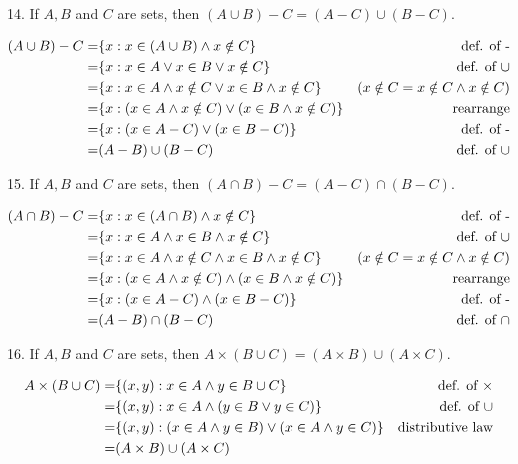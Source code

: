 \documentclass{idrisMemo}
\begin{document}
\begin{prooflist}{14. If $A, B$ and $C$ are sets, then $(A \cup B)-C=(A-C) \cup(B-C)$.}
\item
\begin{align*}
    (A\cup B) - C =& \{x: x\in (A\cup B) \land x\notin C\} & \text{def. of -}\\
    =& \{x: x\in A \lor x \in B \lor x\notin C\} & \text{def. of $\cup$}\\
    =& \{x: x\in A \land x\notin C \lor x\in B \land x\notin C\} & (x\notin C = x\notin C \land x \notin C) \\
    =& \{x: (x\in A \land x\notin C) \lor (x\in B \land x\notin C)\} & \text{rearrange}\\
    =& \{x: (x\in A  - C) \lor (x\in B - C)\} & \text{def. of -}\\
    =& (A - B) \cup (B-C) & \text{def. of }\cup
\end{align*}
\end{prooflist}

\begin{prooflist}{15. If $A, B$ and $C$ are sets, then $(A \cap B)-C=(A-C) \cap(B-C)$.}
\item
\begin{align*}
    (A\cap B) - C =& \{x: x\in (A\cap B) \land x\notin C\} & \text{def. of -}\\
    =& \{x: x\in A \land x \in B \land x\notin C\} & \text{def. of $\cup$}\\
    =& \{x: x\in A \land x\notin C \land x\in B \land x\notin C\} & (x\notin C = x\notin C \land x \notin C) \\
    =& \{x: (x\in A \land x\notin C) \land (x\in B \land x\notin C)\} & \text{rearrange}\\
    =& \{x: (x\in A  - C) \land (x\in B - C)\} & \text{def. of -}\\
    =& (A - B) \cap (B-C) & \text{def. of }\cap
\end{align*}
\end{prooflist}

\begin{prooflist}{16. If $A, B$ and $C$ are sets, then $A \times(B \cup C)=(A \times B) \cup(A \times C)$.}
\item
\begin{align*}
    A\times (B\cup C) =& \{(x, y): x\in A \land y\in B\cup C\} & \text{def. of }\times\\
    =& \{(x,y): x\in A \land (y \in B \lor y\in C)\} & \text{def. of $\cup$}\\
    =& \{(x,y): (x\in A \land y \in B) \lor (x\in A \land y\in C)\} &
    \text{distributive law}\\
    =& (A\times B) \cup (A\times C)
\end{align*}
\end{prooflist}
\end{document}
